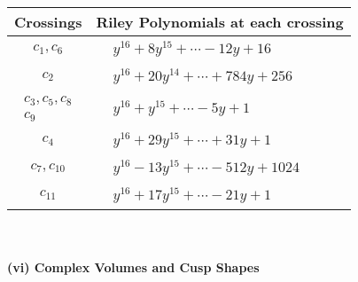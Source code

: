 \documentclass[1p]{elsarticle_modified}
\theoremstyle{definition}
\begin{document}
\begin{tabular}{m{50pt}|m{274pt}}
Crossings & \hspace{64pt}Riley Polynomials at each crossing \\
\hline $$\begin{aligned}c_{1},c_{6}\end{aligned}$$&$\begin{aligned}
&y^{16}+8 y^{15}+\cdots-12 y+16
\end{aligned}$\\
\hline $$\begin{aligned}c_{2}\end{aligned}$$&$\begin{aligned}
&y^{16}+20 y^{14}+\cdots+784 y+256
\end{aligned}$\\
\hline $$\begin{aligned}c_{3},c_{5},c_{8}\\c_{9}\end{aligned}$$&$\begin{aligned}
&y^{16}+y^{15}+\cdots-5 y+1
\end{aligned}$\\
\hline $$\begin{aligned}c_{4}\end{aligned}$$&$\begin{aligned}
&y^{16}+29 y^{15}+\cdots+31 y+1
\end{aligned}$\\
\hline $$\begin{aligned}c_{7},c_{10}\end{aligned}$$&$\begin{aligned}
&y^{16}-13 y^{15}+\cdots-512 y+1024
\end{aligned}$\\
\hline $$\begin{aligned}c_{11}\end{aligned}$$&$\begin{aligned}
&y^{16}+17 y^{15}+\cdots-21 y+1
\end{aligned}$\\
\hline
\end{tabular}\\~\\
\newpage\flushleft \textbf{(vi) Complex Volumes and Cusp Shapes}
\end{document}
